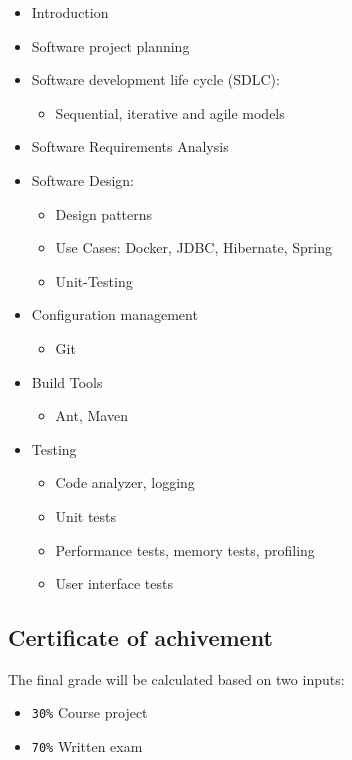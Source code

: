 \begin{itemize}
\item Introduction
\item Software project planning
\item Software development life cycle (SDLC):
  \begin{itemize}
  \item Sequential, iterative and agile models
  \end{itemize}
\item Software Requirements Analysis
\item Software Design:
  \begin{itemize}
  \item Design patterns
  \item Use Cases: Docker, JDBC, Hibernate, Spring
  \item Unit-Testing
  \end{itemize}
\item Configuration management
  \begin{itemize}
  \item Git
\end{itemize}
\item Build Tools
  \begin{itemize}
  \item Ant, Maven
  \end{itemize}
\item Testing
  \begin{itemize}
  \item Code analyzer, logging
  \item Unit tests
  \item Performance tests, memory tests, profiling
  \item User interface tests
  \end{itemize}
\end{itemize}
%
\newslide
\subsection*{Certificate of achivement}
The final grade will be calculated based on two inputs:
\begin{itemize}
\item \verb|30%| Course project
\item \verb|70%| Written exam
\end{itemize}

